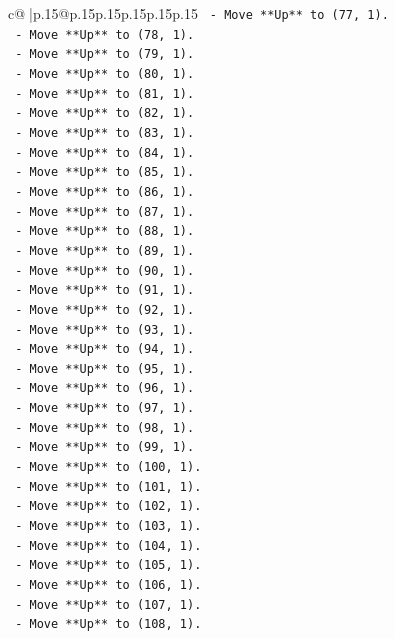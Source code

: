 \documentclass{article}
\begin{document}
{\begin{supertabular}{c@{$\;$}|p{.15\linewidth}@{}p{.15\linewidth}p{.15\linewidth}p{.15\linewidth}p{.15\linewidth}p{.15\linewidth}}
{{{\texttt{  {-} Move **Up** to (77, 1).} \\
\texttt{  {-} Move **Up** to (78, 1).} \\
\texttt{  {-} Move **Up** to (79, 1).} \\
\texttt{  {-} Move **Up** to (80, 1).} \\
\texttt{  {-} Move **Up** to (81, 1).} \\
\texttt{  {-} Move **Up** to (82, 1).} \\
\texttt{  {-} Move **Up** to (83, 1).} \\
\texttt{  {-} Move **Up** to (84, 1).} \\
\texttt{  {-} Move **Up** to (85, 1).} \\
\texttt{  {-} Move **Up** to (86, 1).} \\
\texttt{  {-} Move **Up** to (87, 1).} \\
\texttt{  {-} Move **Up** to (88, 1).} \\
\texttt{  {-} Move **Up** to (89, 1).} \\
\texttt{  {-} Move **Up** to (90, 1).} \\
\texttt{  {-} Move **Up** to (91, 1).} \\
\texttt{  {-} Move **Up** to (92, 1).} \\
\texttt{  {-} Move **Up** to (93, 1).} \\
\texttt{  {-} Move **Up** to (94, 1).} \\
\texttt{  {-} Move **Up** to (95, 1).} \\
\texttt{  {-} Move **Up** to (96, 1).} \\
\texttt{  {-} Move **Up** to (97, 1).} \\
\texttt{  {-} Move **Up** to (98, 1).} \\
\texttt{  {-} Move **Up** to (99, 1).} \\
\texttt{  {-} Move **Up** to (100, 1).} \\
\texttt{  {-} Move **Up** to (101, 1).} \\
\texttt{  {-} Move **Up** to (102, 1).} \\
\texttt{  {-} Move **Up** to (103, 1).} \\
\texttt{  {-} Move **Up** to (104, 1).} \\
\texttt{  {-} Move **Up** to (105, 1).} \\
\texttt{  {-} Move **Up** to (106, 1).} \\
\texttt{  {-} Move **Up** to (107, 1).} \\
\texttt{  {-} Move **Up** to (108, 1).} \\
}}}
\end{supertabular}}
\end{document}
